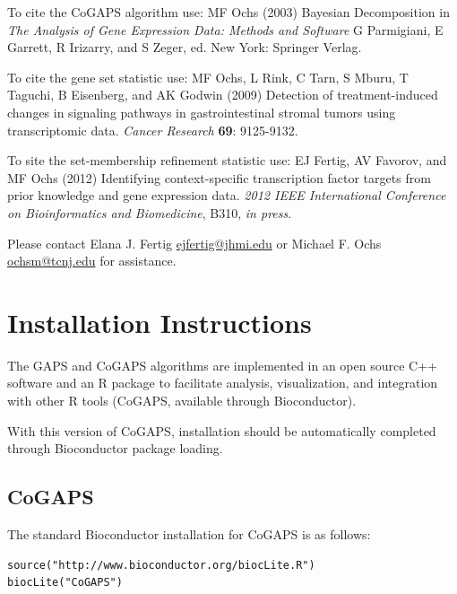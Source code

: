\documentclass{report}
\begin{document}
\par To cite the CoGAPS algorithm use:
\cite{Ochs2003} MF Ochs (2003) Bayesian Decomposition in \textit{The Analysis of Gene Expression Data: Methods and Software} G Parmigiani, E Garrett, R Irizarry, and S Zeger, ed. New York: Springer Verlag.

\par To cite the gene set statistic use:
\cite{Ochs2009} MF Ochs, L Rink, C Tarn, S Mburu, T Taguchi, B Eisenberg, and AK Godwin (2009) Detection of treatment-induced changes in signaling pathways in gastrointestinal stromal tumors using transcriptomic data. \textit{Cancer Research} \textbf{69}: 9125-9132.

\par To site the set-membership refinement statistic use:
\cite{Fertig2012} EJ Fertig, AV Favorov, and MF Ochs (2012) Identifying context-specific transcription factor targets from prior knowledge and gene expression data. \textit{2012 IEEE International Conference on Bioinformatics and Biomedicine}, B310, \textit{in press}.

\par Please contact Elana J. Fertig \url{ejfertig@jhmi.edu} or Michael F. Ochs \url{ochsm@tcnj.edu} for assistance. 

\chapter{Installation Instructions} \label{install}

\par The GAPS and CoGAPS algorithms are implemented in an open source C++ software and an R package to facilitate analysis, visualization, and integration with other R tools (CoGAPS, available through Bioconductor).   

\par With this version of CoGAPS, installation should be automatically completed through Bioconductor package loading.


\section{CoGAPS} \label{CoGAPSInstall}

The standard Bioconductor installation for CoGAPS is as follows:
\begin{verbatim}
source("http://www.bioconductor.org/biocLite.R")
biocLite("CoGAPS")
\end{verbatim}
\end{document}
